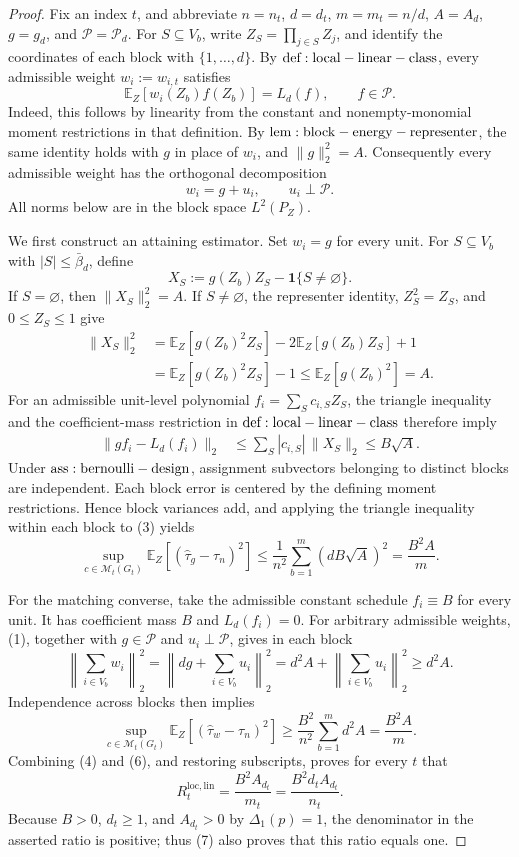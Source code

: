 \documentclass{article}
\begin{document}
\begin{proof}
Fix an index \(t\), and abbreviate \(n=n_t\), \(d=d_t\), \(m=m_t=n/d\), \(A=A_d\), \(g=g_d\), and \(\mathcal P=\mathcal P_d\). For \(S\subseteq V_b\), write \(Z_S=\prod_{j\in S}Z_j\), and identify the coordinates of each block with \(\{1,\ldots,d\}\). By \({\rm def:local-linear-class}\), every admissible weight \(w_i:=w_{i,t}\) satisfies
\[
\mathbb E_Z[w_i(Z_b)f(Z_b)]=L_d(f),\qquad f\in\mathcal P.
\]
Indeed, this follows by linearity from the constant and nonempty-monomial moment restrictions in that definition. By \({\rm lem:block-energy-representer}\), the same identity holds with \(g\) in place of \(w_i\), and \(\lVert g\rVert_2^2=A\). Consequently every admissible weight has the orthogonal decomposition
\[
w_i=g+u_i,\qquad u_i\perp\mathcal P.
\tag{1}
\]
All norms below are in the block space \(L^2(P_Z)\).

We first construct an attaining estimator. Set \(w_i=g\) for every unit. For \(S\subseteq V_b\) with \(|S|\le\bar\beta_d\), define
\[
X_S:=g(Z_b)Z_S-\mathbf 1\{S\ne\varnothing\}.
\]
If \(S=\varnothing\), then \(\lVert X_S\rVert_2^2=A\). If \(S\ne\varnothing\), the representer identity, \(Z_S^2=Z_S\), and \(0\le Z_S\le1\) give
\[
\begin{aligned}
\lVert X_S\rVert_2^2
&=\mathbb E_Z[g(Z_b)^2Z_S]-2\mathbb E_Z[g(Z_b)Z_S]+1\\
&=\mathbb E_Z[g(Z_b)^2Z_S]-1
\le \mathbb E_Z[g(Z_b)^2]=A.
\end{aligned}
\tag{2}
\]
For an admissible unit-level polynomial \(f_i=\sum_Sc_{i,S}Z_S\), the triangle inequality and the coefficient-mass restriction in \({\rm def:local-linear-class}\) therefore imply
\[
\begin{aligned}
\lVert gf_i-L_d(f_i)\rVert_2
&\le\sum_S|c_{i,S}|\,\lVert X_S\rVert_2
\le B\sqrt A.
\end{aligned}
\tag{3}
\]
Under \({\rm ass:bernoulli-design}\), assignment subvectors belonging to distinct blocks are independent. Each block error is centered by the defining moment restrictions. Hence block variances add, and applying the triangle inequality within each block to (3) yields
\[
\sup_{c\in\mathcal M_t(G_t)}
\mathbb E_Z[(\widehat\tau_g-\tau_n)^2]
\le \frac1{n^2}\sum_{b=1}^m(dB\sqrt A)^2
=\frac{B^2A}{m}.
\tag{4}
\]

For the matching converse, take the admissible constant schedule \(f_i\equiv B\) for every unit. It has coefficient mass \(B\) and \(L_d(f_i)=0\). For arbitrary admissible weights, (1), together with \(g\in\mathcal P\) and \(u_i\perp\mathcal P\), gives in each block
\[
\left\lVert\sum_{i\in V_b}w_i\right\rVert_2^2
=\left\lVert dg+\sum_{i\in V_b}u_i\right\rVert_2^2
=d^2A+\left\lVert\sum_{i\in V_b}u_i\right\rVert_2^2
\ge d^2A.
\tag{5}
\]
Independence across blocks then implies
\[
\sup_{c\in\mathcal M_t(G_t)}
\mathbb E_Z[(\widehat\tau_w-\tau_n)^2]
\ge\frac{B^2}{n^2}\sum_{b=1}^m d^2A
=\frac{B^2A}{m}.
\tag{6}
\]
Combining (4) and (6), and restoring subscripts, proves for every \(t\) that
\[
R_t^{\mathrm{loc,lin}}=\frac{B^2A_{d_t}}{m_t}
=\frac{B^2d_tA_{d_t}}{n_t}.
\tag{7}
\]
Because \(B>0\), \(d_t\ge1\), and \(A_{d_t}>0\) by \(\Delta_1(p)=1\), the denominator in the asserted ratio is positive; thus (7) also proves that this ratio equals one.


\end{proof}
\end{document}
